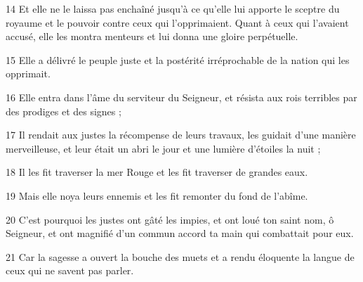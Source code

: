 \par 14 Et elle ne le laissa pas enchaîné jusqu'à ce qu'elle lui apporte le sceptre du royaume et le pouvoir contre ceux qui l'opprimaient. Quant à ceux qui l'avaient accusé, elle les montra menteurs et lui donna une gloire perpétuelle.
\par 15 Elle a délivré le peuple juste et la postérité irréprochable de la nation qui les opprimait.
\par 16 Elle entra dans l'âme du serviteur du Seigneur, et résista aux rois terribles par des prodiges et des signes ;
\par 17 Il rendait aux justes la récompense de leurs travaux, les guidait d'une manière merveilleuse, et leur était un abri le jour et une lumière d'étoiles la nuit ;
\par 18 Il les fit traverser la mer Rouge et les fit traverser de grandes eaux.
\par 19 Mais elle noya leurs ennemis et les fit remonter du fond de l'abîme.
\par 20 C'est pourquoi les justes ont gâté les impies, et ont loué ton saint nom, ô Seigneur, et ont magnifié d'un commun accord ta main qui combattait pour eux.
\par 21 Car la sagesse a ouvert la bouche des muets et a rendu éloquente la langue de ceux qui ne savent pas parler.


